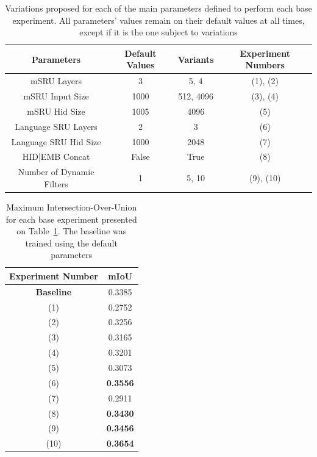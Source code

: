 \begin{table}[!htbp]
    \centering
    \begin{tabular}{|c|c|c|c|}
        \hline
        Parameters & Default Values & Variants & Experiment Numbers \\
        \hline
        mSRU Layers & 3 & 5, 4 & (1), (2)  \\
        \hline
        mSRU Input Size & 1000 & 512, 4096 & (3), (4) \\
        \hline
        mSRU Hid Size & 1005 & 4096 & (5) \\
        \hline
        Language SRU Layers & 2 & 3 & (6) \\
        \hline
        Language SRU Hid Size & 1000 & 2048 & (7) \\
        \hline
        HID|EMB Concat & False & True & (8) \\
        \hline
        Number of Dynamic Filters & 1 & 5, 10 & (9), (10) \\
        \hline
    \end{tabular}
    \caption{Variations proposed for each of the main parameters defined to perform each base experiment. All parameters' values remain on their default values at all times, except if it is the one subject to variations}
    \label{Tab:Arch_Exps}
\end{table}

\begin{table}[!htbp]
    \centering
    \begin{tabular}{|c|c|}
        \hline
        Experiment Number & mIoU \\
        \hline
        \textbf{Baseline} & 0.3385  \\
        \hline
        (1) & 0.2752 \\
        \hline
        (2) & 0.3256 \\
        \hline
        (3) & 0.3165 \\
        \hline
        (4) & 0.3201 \\
        \hline
        (5) & 0.3073 \\
        \hline
        (6) & \textbf{0.3556} \\
        \hline
        (7) & 0.2911 \\
        \hline
        (8) & \textbf{0.3430} \\
        \hline
        (9) & \textbf{0.3456} \\
        \hline
        (10) & \textbf{0.3654} \\
        \hline
    \end{tabular}
    \caption{Maximum Intersection-Over-Union for each base experiment presented on Table~\ref{Tab:Arch_Exps}. The baseline was trained using the default parameters}
    \label{Tab:Base_IoU}
\end{table}

